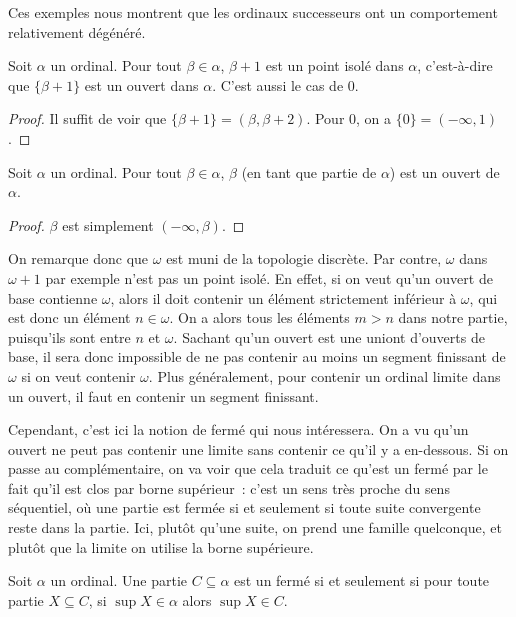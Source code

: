 Ces exemples nous montrent que les ordinaux successeurs ont un comportement
relativement dégénéré.

\begin{proposition}
  Soit $\alpha$ un ordinal. Pour tout $\beta \in \alpha$, $\beta + 1$ est un
  point isolé dans $\alpha$, c'est-à-dire que $\{\beta + 1\}$ est un ouvert
  dans $\alpha$. C'est aussi le cas de $0$.
\end{proposition}

\begin{proof}
  Il suffit de voir que $\{\beta + 1\} = (\beta, \beta + 2)$. Pour $0$, on a
  $\{0\} = (-\infty, 1)$.
\end{proof}

\begin{proposition}
  Soit $\alpha$ un ordinal. Pour tout $\beta \in \alpha$, $\beta$ (en tant que
  partie de $\alpha$) est un ouvert de $\alpha$.
\end{proposition}

\begin{proof}
  $\beta$ est simplement $(-\infty, \beta)$.
\end{proof}

On remarque donc que $\omega$ est muni de la topologie discrète. Par contre,
$\omega$ dans $\omega + 1$ par exemple n'est pas un point isolé. En effet,
si on veut qu'un ouvert de base contienne $\omega$, alors il doit contenir un
élément strictement inférieur à $\omega$, qui est donc un élément
$n \in \omega$. On a alors tous les éléments $m > n$ dans notre partie,
puisqu'ils sont entre $n$ et $\omega$. Sachant qu'un ouvert est une uniont
d'ouverts de base, il sera donc impossible de ne pas contenir au moins un
segment finissant de $\omega$ si on veut contenir $\omega$. Plus généralement,
pour contenir un ordinal limite dans un ouvert, il faut en contenir un segment
finissant.

Cependant, c'est ici la notion de fermé qui nous intéressera. On a vu qu'un
ouvert ne peut pas contenir une limite sans contenir ce qu'il y a en-dessous.
Si on passe au complémentaire, on va voir que cela traduit ce qu'est un fermé
par le fait qu'il est clos par borne supérieur~: c'est un sens très proche du
sens séquentiel, où une partie est fermée si et seulement si toute suite
convergente reste dans la partie. Ici, plutôt qu'une suite, on prend une famille
quelconque, et plutôt que la limite on utilise la borne supérieure.

\begin{proposition}
  Soit $\alpha$ un ordinal. Une partie $C\subseteq \alpha$ est un fermé si et
  seulement si pour toute partie $X\subseteq C$, si $\sup X \in \alpha$ alors
  $\sup X \in C$.
\end{proposition}

